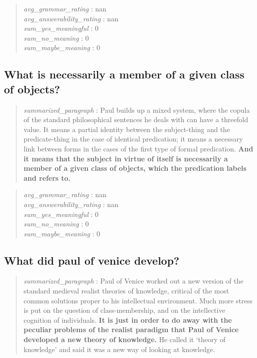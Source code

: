 \begin{quote}
\emph{avg\_grammar\_rating} : nan\\
\emph{avg\_answerability\_rating} : nan\\
\emph{sum\_yes\_meaningful} : 0\\
\emph{sum\_no\_meaning} : 0\\
\emph{sum\_maybe\_meaning} : 0
\end{quote}

\hypertarget{what-is-necessarily-a-member-of-a-given-class-of-objects}{%
\subsection{What is necessarily a member of a given class of
objects?}\label{what-is-necessarily-a-member-of-a-given-class-of-objects}}

\begin{quote}
\emph{summarized\_paragraph} : Paul builds up a mixed system, where the
copula of the standard philosophical sentences he deals with can have a
threefold value. It means a partial identity between the subject-thing
and the predicate-thing in the case of identical predication; it means a
necessary link between forms in the cases of the first type of formal
predication. \textbf{And it means that the subject in virtue of itself
is necessarily a member of a given class of objects, which the
predication labels and refers to.}
\end{quote}

\begin{quote}
\emph{avg\_grammar\_rating} : nan\\
\emph{avg\_answerability\_rating} : nan\\
\emph{sum\_yes\_meaningful} : 0\\
\emph{sum\_no\_meaning} : 0\\
\emph{sum\_maybe\_meaning} : 0
\end{quote}

\hypertarget{what-did-paul-of-venice-develop}{%
\subsection{What did paul of venice
develop?}\label{what-did-paul-of-venice-develop}}

\begin{quote}
\emph{summarized\_paragraph} : Paul of Venice worked out a new version
of the standard medieval realist theories of knowledge, critical of the
most common solutions proper to his intellectual environment. Much more
stress is put on the question of class-membership, and on the
intellective cognition of individuals. \textbf{It is just in order to do
away with the peculiar problems of the realist paradigm that Paul of
Venice developed a new theory of knowledge.} He called it `theory of
knowledge' and said it was a new way of looking at knowledge.
\end{quote}

